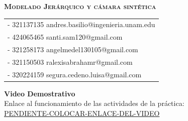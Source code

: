 \documentclass[a4paper, 11pt]{article}
\begin{document}
\newpage

\begin{center}
    \vspace{50cm}
    {\Large\scshape\textbf{Modelado Jerárquico y cámara sintética}}\\[.5in]
\end{center}

\begin{tabular}[t]{l}
    - 321137135 andres.basilio@ingenieria.unam.edu \\[0.5cm]
    - 424065465 santi.sam120@gmail.com \\[0.5cm]
    - 321258173 angelmedel130105@gmail.com\\[0.5cm]
    - 321150503 ralexisabrahamr@gmail.com \\[0.5cm]
    - 320224159 segura.cedeno.luisa@gmail.com \\[0.5cm]
\end{tabular}

\newpage









\vspace{1.5cm}
\begin{center}
    \Large\textbf{Video Demostrativo} \\[0.5cm]
    \normalsize
    Enlace al funcionamiento de las actividades de la práctica: \\[0.3cm]
    \url{PENDIENTE-COLOCAR-ENLACE-DEL-VIDEO}
\end{center}
\end{document}
